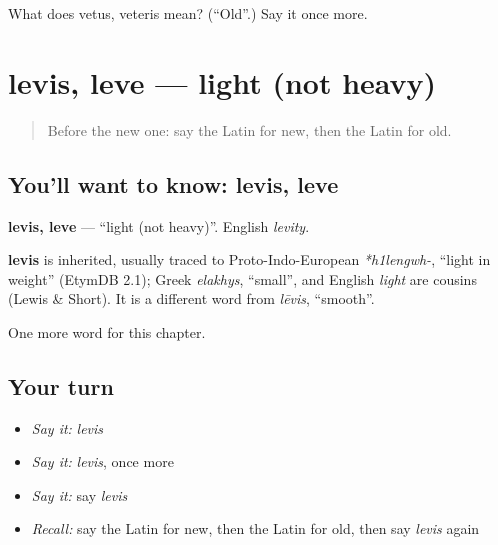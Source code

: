 \begin{tcolorbox}[breakable,colback=teal!4,colframe=teal!35!black,title={Before you move on}]
What does vetus, veteris mean? (\textquotedblleft{}Old\textquotedblright{}.) Say it once more.
\end{tcolorbox}
\section[levis, leve]{levis, leve — light (not heavy)}

\label{lesson:LA-C94-levis}



\begin{quote}
Before the new one: say the Latin for new, then the Latin for old.
\end{quote}

\subsection*{You'll want to know: levis, leve}
\textbf{levis, leve} — \textquotedblleft{}light (not heavy)\textquotedblright{}. English \emph{levity}.

\begin{cousinweb}
\textbf{levis} is inherited, usually traced to Proto-Indo-European \emph{*h1lengwh-}, \textquotedblleft{}light in weight\textquotedblright{} (EtymDB 2.1); Greek \emph{elakhys}, \textquotedblleft{}small\textquotedblright{}, and English \emph{light} are cousins (Lewis \& Short). It is a different word from \emph{lēvis}, \textquotedblleft{}smooth\textquotedblright{}.
\end{cousinweb}

\begin{grammarlens}[title={What you've built}]
One more word for this chapter.
\end{grammarlens}

\subsection*{Your turn}
\begin{itemize}
\raggedright
  \item \emph{Say it:} \emph{levis}
  \item \emph{Say it:} \emph{levis}, once more
  \item \emph{Say it:} say \emph{levis}
  \item \emph{Recall:} say the Latin for new, then the Latin for old, then say \emph{levis} again
\end{itemize}

